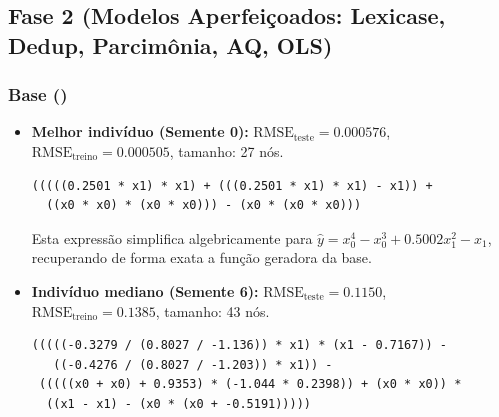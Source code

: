 \subsection{Fase 2 (Modelos Aperfeiçoados: Lexicase, Dedup, Parcimônia, AQ, OLS)}

\subsubsection{Base  ()}
\begin{itemize}
  \item \textbf{Melhor indivíduo (Semente 0):}
        $\text{RMSE}_{\text{teste}} = \mathbf{0.000576}$, $\text{RMSE}_{\text{treino}} = 0.000505$, tamanho: 27 nós.
\begin{lstlisting}
(((((0.2501 * x1) * x1) + (((0.2501 * x1) * x1) - x1)) +
  ((x0 * x0) * (x0 * x0))) - (x0 * (x0 * x0)))
\end{lstlisting}
  Esta expressão simplifica algebricamente para $\hat{y} = x_0^4 - x_0^3 + 0.5002 x_1^2 - x_1$,
  recuperando de forma exata a função geradora da base.
  \item \textbf{Indivíduo mediano (Semente 6):}
        $\text{RMSE}_{\text{teste}} = 0.1150$, $\text{RMSE}_{\text{treino}} = 0.1385$, tamanho: 43 nós.
\begin{lstlisting}
(((((-0.3279 / (0.8027 / -1.136)) * x1) * (x1 - 0.7167)) -
   ((-0.4276 / (0.8027 / -1.203)) * x1)) -
 (((((x0 + x0) + 0.9353) * (-1.044 * 0.2398)) + (x0 * x0)) *
  ((x1 - x1) - (x0 * (x0 + -0.5191)))))
\end{lstlisting}
\end{itemize}

